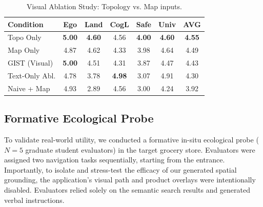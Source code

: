 \documentclass[sigconf,anonymous,review]{acmart}
\begin{document}
\begin{table}[h]
  \centering
  \caption{Visual Ablation Study: Topology vs. Map inputs.}
  \label{tab:visual-ablation}
  \small
  \begin{tabular}{@{}lcccccc@{}}
  \toprule
  \textbf{Condition} & \textbf{Ego} & \textbf{Land} & \textbf{CogL} & \textbf{Safe} & \textbf{Univ} & \textbf{AVG} \\
  \midrule
  Topo Only & \textbf{5.00} & \textbf{4.60} & 4.56 & \textbf{4.00} & \textbf{4.60} & \textbf{4.55} \\
  Map Only & 4.87 & 4.62 & 4.33 & 3.98 & 4.64 & 4.49 \\
  GIST (Visual) & \textbf{5.00} & 4.51 & 4.31 & 3.87 & 4.47 & 4.43 \\
  \midrule
  Text-Only Abl. & 4.78 & 3.78 & \textbf{4.98} & 3.07 & 4.91 & 4.30 \\
  Naive + Map & 4.93 & 2.89 & 4.56 & 3.00 & 4.24 & 3.92 \\
  \bottomrule
  \end{tabular}
\end{table}

\subsection{Formative Ecological Probe}
To validate real-world utility, we conducted a formative in-situ ecological probe ($N=5$ graduate student evaluators) in the target grocery store. Evaluators were assigned two navigation tasks sequentially, starting from the entrance. Importantly, to isolate and stress-test the efficacy of our generated spatial grounding, the application's visual path and product overlays were intentionally disabled. Evaluators relied solely on the semantic search results and generated verbal instructions. 
\end{document}
